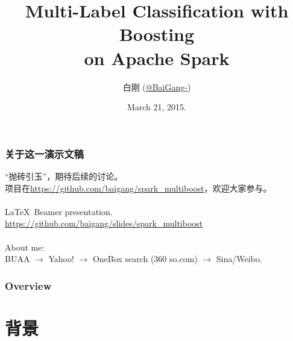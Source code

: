 \documentclass{beamer}
\title[MultiBoost]{Multi-Label Classification with Boosting \\ on Apache Spark}
\author{
白刚  (\href{http://weibo.com/baigang111}{@BaiGang-})
} %
\institute[Sina] %
{
\textit{Sina Ad-Algo}
}
\date{March 21, 2015.} %
\begin{document}
\begin{frame}
\titlepage %
\end{frame}

\begin{frame}
\frametitle{关于这一演示文稿}
“抛砖引玉”，期待后续的讨论。 \\
项目在\url{https://github.com/baigang/spark_multiboost}，欢迎大家参与。 \\ \ \\

\LaTeX\  Beamer presentation.  \\
\url{https://github.com/baigang/slides/spark_multiboost} \\ \ \\

About me: \\
BUAA $\rightarrow$ Yahoo! $\rightarrow$ OneBox search (360 so.com) $\rightarrow$ Sina/Weibo.

\end{frame}

\begin{frame}
\frametitle{Overview} %
\tableofcontents %
\end{frame}



\section{背景}
\end{document}

